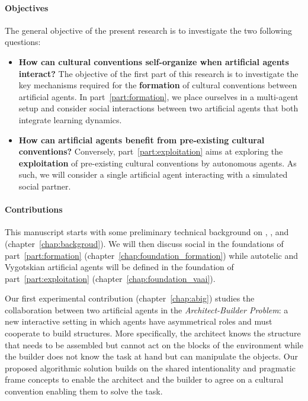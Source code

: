 \paragraph{Objectives}

The general objective of the present research is to investigate the two following questions: 
\begin{itemize}
	\item \textbf{How can cultural conventions self-organize when artificial agents interact?} The objective of the first part of this research is to investigate the key mechanisms required for the \textbf{formation} of cultural conventions between artificial agents. In part~\ref{part:formation}, we place ourselves in a multi-agent setup and consider social interactions between two artificial agents that both integrate learning dynamics. 
	\item \textbf{How can artificial agents benefit from pre-existing cultural conventions?} Conversely, part~\ref{part:exploitation} aims at exploring the \textbf{exploitation} of pre-existing cultural conventions by autonomous agents. As such, we will consider a single artificial agent interacting with a simulated social partner.
\end{itemize}


\paragraph{Contributions}

This manuscript starts with some preliminary technical background on \rl, \il, and \marl (chapter~\ref{chap:backgroud}). We will then discuss social \marl in the foundations of part~\ref{part:formation} (chapter~\ref{chap:foundation_formation}) while autotelic and Vygotskian artificial agents will be defined in the foundation of part~\ref{part:exploitation} (chapter~\ref{chap:foundation_vaai}). 

Our first experimental contribution (chapter~\ref{chap:abig}) studies the collaboration between two artificial agents in the \textit{Architect-Builder Problem}: a new interactive setting in which agents have asymmetrical roles and must cooperate to build structures. More specifically, the architect knows the structure that needs to be assembled but cannot act on the blocks of the environment while the builder does not know the task at hand but can manipulate the objects. Our proposed algorithmic solution builds on the shared intentionality and pragmatic frame concepts to enable the architect and the builder to agree on a cultural convention enabling them to solve the task. 

